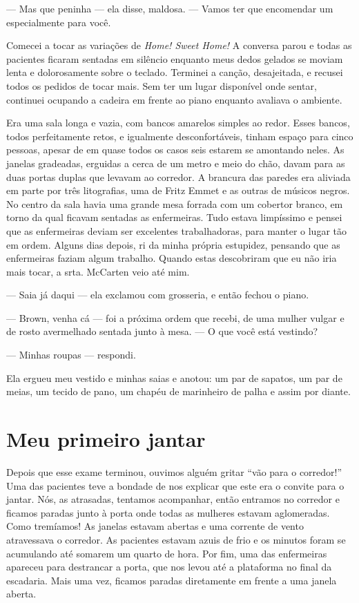--- Mas que peninha --- ela disse, maldosa. --- Vamos ter que encomendar
um especialmente para você.

Comecei a tocar as variações de \emph{Home! Sweet Home!} A conversa parou e
todas as pacientes ficaram sentadas em silêncio enquanto meus dedos
gelados se moviam lenta e dolorosamente sobre o teclado. Terminei a
canção, desajeitada, e recusei todos os pedidos de tocar mais. Sem ter
um lugar disponível onde sentar, continuei ocupando a cadeira em frente
ao piano enquanto avaliava o ambiente.

Era uma sala longa e vazia, com bancos amarelos simples ao redor. Esses
bancos, todos perfeitamente retos, e igualmente desconfortáveis, tinham
espaço para cinco pessoas, apesar de em quase todos os casos seis estarem
se amontando neles. As janelas gradeadas, erguidas a cerca de um metro e
meio do chão, davam para as duas portas duplas que levavam ao corredor.
A brancura das paredes era aliviada em parte por três litografias, uma
de Fritz Emmet e as outras de músicos negros. No centro da sala havia
uma grande mesa forrada com um cobertor branco, em torno da qual ficavam
sentadas as enfermeiras. Tudo estava limpíssimo e pensei que as
enfermeiras deviam ser excelentes trabalhadoras, para manter o lugar tão
em ordem. Alguns dias depois, ri da minha própria estupidez, pensando
que as enfermeiras faziam algum trabalho. Quando estas descobriram que
eu não iria mais tocar, a srta. McCarten veio até mim.

--- Saia já daqui --- ela exclamou com grosseria, e então fechou o
piano.

--- Brown, venha cá --- foi a próxima ordem que recebi, de uma mulher
vulgar e de rosto avermelhado sentada junto à mesa. --- O que você está
vestindo?

--- Minhas roupas --- respondi.

Ela ergueu meu vestido e minhas saias e anotou: um par de sapatos, um
par de meias, um tecido de pano, um chapéu de marinheiro de palha e
assim por diante.

\chapter{Meu primeiro
jantar}\label{capuxedtulo-x-meu-primeiro-jantar}

Depois que esse exame terminou, ouvimos alguém gritar ``vão para o
corredor!'' Uma das pacientes teve a bondade de nos explicar que este
era o convite para o jantar. Nós, as atrasadas, tentamos acompanhar,
então entramos no corredor e ficamos paradas junto à porta onde todas as
mulheres estavam aglomeradas. Como tremíamos! As janelas estavam abertas
e uma corrente de vento atravessava o corredor. As pacientes estavam
azuis de frio e os minutos foram se acumulando até somarem um quarto de
hora. Por fim, uma das enfermeiras apareceu para destrancar a porta, que
nos levou até a plataforma no final da escadaria. Mais uma vez, ficamos
paradas diretamente em frente a uma janela aberta.

